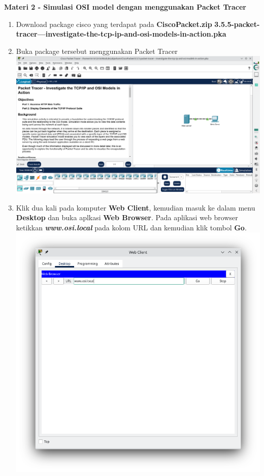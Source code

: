 \documentclass{article}
\begin{document}
    \begin{flushleft}
        \textbf{Materi 2 - Simulasi OSI model dengan menggunakan Packet Tracer}
        \newline

        \begin{enumerate}
            \item Download package cisco yang terdapat pada \textbf{ CiscoPacket.zip}
            \newline
            \textbf{3.5.5-packet-tracer---investigate-the-tcp-ip-and-osi-models-in-action.pka}

            \item Buka package tersebut menggunakan Packet Tracer
            \newline
            \includegraphics[scale=0.3]{2-open-packet.png}

            \item Klik dua kali pada komputer \textbf{Web Client}, kemudian masuk ke dalam menu \textbf{Desktop} dan buka aplkasi \textbf{Web Browser}. Pada aplikasi web browser ketikkan \textbf{\textit{www.osi.local}} pada kolom URL dan kemudian klik tombol \textbf{Go}.
            \newline
            \includegraphics[scale=0.5]{2-open-broswer.png}


\end{enumerate}
\end{flushleft}
\end{document}

